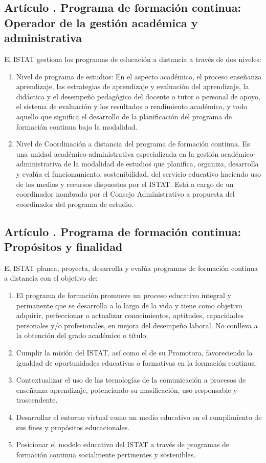 \subsection{Artículo . Programa de formación continua: Operador de la gestión académica y administrativa}
\addtocounter{ns}{1}
El ISTAT gestiona los programas de educación a distancia a través de dos niveles:
\begin{enumerate}
\item Nivel de programa de estudios: En el aspecto académico, el proceso enseñanza aprendizaje, las estrategias de aprendizaje y evaluación del aprendizaje, la didáctica y el desempeño pedagógico del docente o tutor o personal de apoyo, el sistema de evaluación y los resultados o rendimiento académico, y todo aquello que significa el desarrollo de la planificación del programa de formación continua bajo la modalidad. 
\item Nivel de Coordinación a distancia del programa de formación continua. Es una unidad académico-administrativa especializada en la gestión académico-administrativa de la modalidad de estudios que planifica, organiza, desarrolla y evalúa el funcionamiento, sostenibilidad, del servicio educativo haciendo uso de los medios y recursos dispuestos por el ISTAT. Está a cargo de un coordinador nombrado por el Consejo Administrativo a propuesta del coordinador del programa de estudio.
\end{enumerate}
\subsection{Artículo . Programa de formación continua: Propósitos y finalidad}
\addtocounter{ns}{1}
El ISTAT planea, proyecta, desarrolla y evalúa programas de formación continua a distancia con el objetivo de: 
\begin{enumerate}
\item El programa de formación promueve un proceso educativo integral y permanente que se desarrolla a lo largo de la vida y tiene como objetivo adquirir, perfeccionar o actualizar conocimientos, aptitudes, capacidades personales y/o profesionales, en mejora del desempeño laboral. No conlleva a la obtención del grado académico o título.
\item Cumplir la misión del ISTAT, así como el de su Promotora, favoreciendo la igualdad de oportunidades educativas o formativas en la formación continua. 
\item Contextualizar el uso de las tecnologías de la comunicación a procesos de enseñanza-aprendizaje, potenciando su masificación, uso responsable y trascendente. 
\item Desarrollar el entorno virtual como un medio educativo en el cumplimiento de sus fines y propósitos educacionales. 
\item Posicionar el modelo educativo del ISTAT a través de programas de formación continua socialmente pertinentes y sostenibles.
\end{enumerate}
